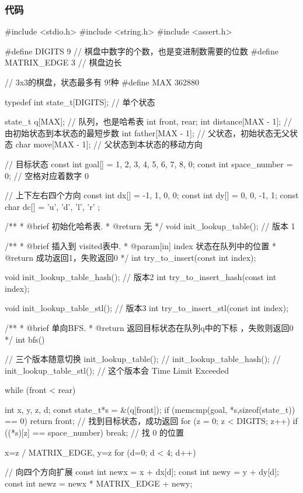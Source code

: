 \subsubsection{代码}
\begin{Codex}[label=eight_digits_bfs.c]
#include <stdio.h>
#include <string.h>
#include <assert.h>

#define DIGITS 9 // 棋盘中数字的个数，也是变进制数需要的位数
#define     MATRIX_EDGE 3       // 棋盘边长

// 3x3的棋盘，状态最多有 9!种
#define     MAX         362880

typedef int state_t[DIGITS]; // 单个状态

state_t q[MAX]; // 队列，也是哈希表
int front, rear;
int distance[MAX - 1]; // 由初始状态到本状态的最短步数
int father[MAX - 1]; // 父状态，初始状态无父状态
char move[MAX - 1]; // 父状态到本状态的移动方向

// 目标状态
const int goal[] = {1, 2, 3, 4, 5, 6, 7, 8, 0};
const int space_number = 0; // 空格对应着数字 0

// 上下左右四个方向
const int dx[] = {-1, 1, 0, 0};
const int dy[] = {0, 0, -1, 1};
const char dc[] = { 'u', 'd', 'l', 'r' };

/**
 * @brief 初始化哈希表.
 * @return 无
 */
void init_lookup_table(); // 版本 1

/**
 * @brief 插入到 visited表中.
 * @param[in] index 状态在队列中的位置
 * @return 成功返回1，失败返回0
 */
int try_to_insert(const int index);

void init_lookup_table_hash(); // 版本2
int try_to_insert_hash(const int index);

void init_lookup_table_stl(); // 版本3
int try_to_insert_stl(const int index);

/**
 * @brief 单向BFS.
 * @return 返回目标状态在队列q中的下标 ，失败则返回0
 */
int bfs() {
    // 三个版本随意切换
    init_lookup_table();
    // init_lookup_table_hash();
    // init_lookup_table_stl(); // 这个版本会 Time Limit Exceeded

    while (front < rear) {
        int x, y, z, d;
        const state_t*s = &(q[front]);
        if (memcmp(goal, *s,sizeof(state_t)) == 0) {
            return front;  // 找到目标状态，成功返回
        }
        for (z = 0; z < DIGITS; z++)  if ((*s)[z] == space_number) {
            break;  // 找 0 的位置
        }
        
        x=z / MATRIX_EDGE, y=z %
        for (d=0; d < 4; d++) {  // 向四个方向扩展
            const int newx = x + dx[d];
            const int newy = y + dy[d];
            const int newz = newx * MATRIX_EDGE + newy;

}}}
\end{Codex}
